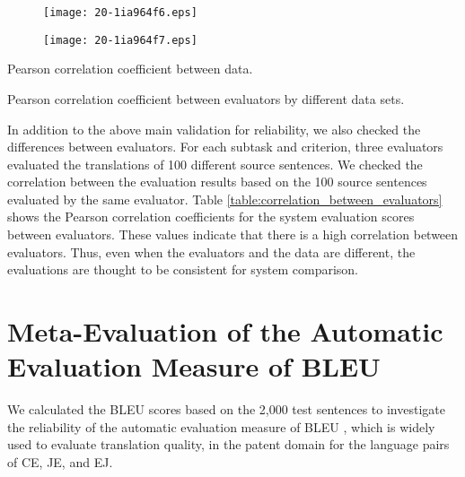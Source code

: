 \documentclass[english]{jnlp_1.4}
\begin{document}
\begin{figure}[t]
\setlength{\captionwidth}{192pt}
\begin{minipage}[b]{200pt}
\begin{center}
\texttt{[image: 20-1ia964f6.eps]}
\end{center}
\label{fig:comparison_data_EJ_adequacy}
\end{minipage}
\hfill
\begin{minipage}[b]{200pt}
\begin{center}
\texttt{[image: 20-1ia964f7.eps]}
\end{center}
\label{fig:comparison_data_EJ_acceptability}
\end{minipage}
\end{figure}
\begin{table}[t]
\caption{Pearson correlation coefficient between data.}
\label{table:correlation_between_data}

\end{table}
\begin{table}[t]
\caption{Pearson correlation coefficient between evaluators by different data sets.}
\label{table:correlation_between_evaluators}

\end{table}

In addition to the above main validation for reliability, we also checked the differences between evaluators. 
For each subtask and criterion, three evaluators evaluated the translations of 100 different source sentences. 
We checked the correlation between the evaluation results based on the 100 source sentences evaluated by the same evaluator. 
Table \ref{table:correlation_between_evaluators} shows the Pearson correlation coefficients for the system evaluation scores between evaluators.
These values indicate that there is a high correlation between evaluators. 
Thus, even when the evaluators and the data are different, the evaluations are thought to be consistent for system comparison. 


\section{Meta-Evaluation of the Automatic Evaluation Measure of BLEU}
\label{sec:meta-evaluation}

We calculated the BLEU scores based on the 2,000 test sentences to investigate the reliability of the automatic evaluation measure of BLEU \cite{papineni-EtAl:2002:ACL}, which is widely used to evaluate translation quality, in the patent domain for the language pairs of CE, JE, and EJ. 
\end{document}
